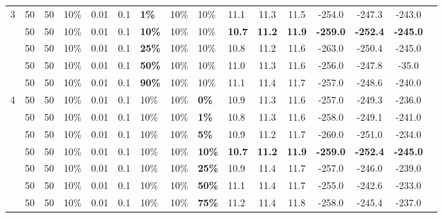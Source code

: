 \begin{sidewaystable}
\begin{tabular}{|l|l|l|l|l|l|l|l|l|l||c|c|c|c|c|c|}
    \hline
    3 & 50 & 50 & 10\% & 0.01 & 0.1 & \textbf{1\%} & 10\% & 10\% & 11.1 & 11.3 & 11.5 & -254.0 & -247.3 & -243.0 \\
    ~ & 50 & 50 & 10\% & 0.01 & 0.1 & \textbf{10\%} & 10\% & 10\% & \textbf{10.7} & \textbf{11.2} & \textbf{11.9} & \textbf{-259.0} & \textbf{-252.4} & \textbf{-245.0} \\
    ~ & 50 & 50 & 10\% & 0.01 & 0.1 & \textbf{25\%} & 10\% & 10\% & 10.8 & 11.2 & 11.6 & -263.0 & -250.4 & -245.0 \\
    ~ & 50 & 50 & 10\% & 0.01 & 0.1 & \textbf{50\%} & 10\% & 10\% & 11.0 & 11.3 & 11.6 & -256.0 & -247.8 & -35.0 \\
    ~ & 50 & 50 & 10\% & 0.01 & 0.1 & \textbf{90\%} & 10\% & 10\% & 11.1 & 11.4 & 11.7 & -257.0 & -248.6 & -240.0 \\
    \hline
       4 & 50 & 50 & 10\% & 0.01 & 0.1 & 10\% & 10\% & \textbf{0\%} & 10.9 & 11.3 & 11.6 & -257.0 & -249.3 & -236.0 \\
    ~ & 50 & 50 & 10\% & 0.01 & 0.1 & 10\% & 10\% & \textbf{1\%} & 10.8 & 11.3 & 11.6 & -258.0 & -249.1 & -241.0 \\
    ~ & 50 & 50 & 10\% & 0.01 & 0.1 & 10\% & 10\% & \textbf{5\%} &  10.9 & 11.2 & 11.7 & -260.0 & -251.0 & -234.0 \\
    ~ & 50 & 50 & 10\% & 0.01 & 0.1 & 10\% & 10\% & \textbf{10\%} & \textbf{10.7} & \textbf{11.2} & \textbf{11.9} & \textbf{-259.0} & \textbf{-252.4} & \textbf{-245.0} \\
    ~ & 50 & 50 & 10\% & 0.01 & 0.1 & 10\% & 10\% & \textbf{25\%} & 10.9 & 11.4 & 11.7 & -257.0 & -246.0 & -239.0 \\
    ~ & 50 & 50 & 10\% & 0.01 & 0.1 & 10\% & 10\% & \textbf{50\%} & 11.1 & 11.4 & 11.7 & -255.0 & -242.6 & -233.0 \\
    ~ & 50 & 50 & 10\% & 0.01 & 0.1 & 10\% & 10\% & \textbf{75\%} & 11.2 & 11.4 & 11.8 & -258.0 & -245.4 & -237.0 \\

\end{tabular}
\end{sidewaystable}
